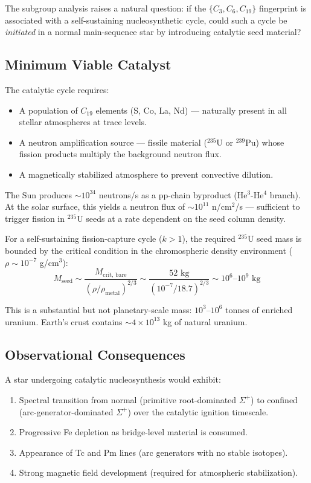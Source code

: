The subgroup analysis raises a natural question: if the $\{C_3, C_6, C_{19}\}$
fingerprint is associated with a self-sustaining nucleosynthetic cycle, could
such a cycle be \emph{initiated} in a normal main-sequence star by introducing
catalytic seed material?

\subsection{Minimum Viable Catalyst}

The catalytic cycle requires:
\begin{itemize}
  \item A population of $C_{19}$ elements (S, Co, La, Nd) --- naturally present
    in all stellar atmospheres at trace levels.
  \item A neutron amplification source --- fissile material ($^{235}$U or
    $^{239}$Pu) whose fission products multiply the background neutron flux.
  \item A magnetically stabilized atmosphere to prevent convective dilution.
\end{itemize}

The Sun produces $\sim 10^{34}$ neutrons/s as a pp-chain byproduct
(He$^3$-He$^4$ branch). At the solar surface, this yields a neutron flux of
$\sim 10^{11}$ n/cm$^2$/s --- sufficient to trigger fission in $^{235}$U seeds
at a rate dependent on the seed column density.

For a self-sustaining fission-capture cycle ($k > 1$), the required $^{235}$U
seed mass is bounded by the critical condition in the chromospheric density
environment ($\rho \sim 10^{-7}$ g/cm$^3$):
\begin{equation}
M_\text{seed} \sim \frac{M_\text{crit, bare}}{(\rho / \rho_\text{metal})^{2/3}}
  \sim \frac{52 \text{ kg}}{(10^{-7}/18.7)^{2/3}} \sim 10^6 \text{--} 10^9 \text{ kg}
\end{equation}

This is a substantial but not planetary-scale mass: $10^3$--$10^6$ tonnes of
enriched uranium. Earth's crust contains $\sim 4 \times 10^{13}$ kg of natural
uranium.

\subsection{Observational Consequences}

A star undergoing catalytic nucleosynthesis would exhibit:
\begin{enumerate}
  \item Spectral transition from normal (primitive root-dominated $\Sigma^+$)
    to confined (arc-generator-dominated $\Sigma^+$) over the catalytic ignition
    timescale.
  \item Progressive Fe depletion as bridge-level material is consumed.
  \item Appearance of Tc and Pm lines (arc generators with no stable isotopes).
  \item Strong magnetic field development (required for atmospheric stabilization).
\end{enumerate}


